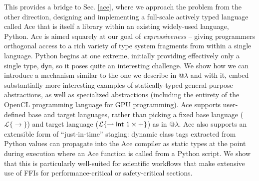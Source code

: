 This provides a bridge to Sec. \ref{ace}, where we approach the problem from the other direction, designing and implementing a full-scale actively typed language called Ace that is itself a library within an existing widely-used language, Python. Ace is aimed squarely at our goal of \emph{expressiveness} -- giving  programmers orthogonal access to a rich variety of type system fragments from within a single   language. Python begins at one extreme, initially providing effectively only a single type, \texttt{dyn}, so it poses quite an interesting challenge. We show how we can introduce a mechanism similar to the one we describe in @$\lambda$ and with it, embed substantially more interesting examples of statically-typed general-purpose abstractions, as well as specialized abstractions (including the entirety of the OpenCL programming language for GPU programming). Ace  supports user-defined base and target languages, rather than picking a fixed base language ($\mathcal{L}\{\rightarrow\}$) and target language ($\mathcal{L}\{\rightharpoonup {\sf Int}~\textsf{1} \times{+}\}$) as in @$\lambda$. Ace also supports an extensible form of ``just-in-time'' staging: dynamic class tags extracted from Python values can propagate into the Ace compiler as static types at the point during execution where an Ace function is called from a Python script. We show that this is particularly well-suited for scientific workflows that make extensive use of FFIs for performance-critical or safety-critical  sections. 




